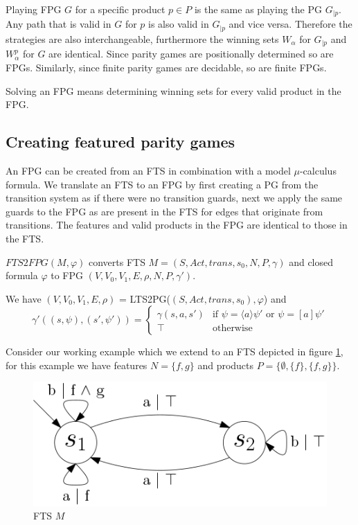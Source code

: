 Playing FPG $G$ for a specific product $p\in P$ is the same as playing the PG $G_{|p}$. Any path that is valid in $G$ for $p$ is also valid in $G_{|p}$ and vice versa. Therefore the strategies are also interchangeable, furthermore the winning sets $W_\alpha$ for $G_{|p}$ and $W_\alpha^p$ for $G$ are identical. Since parity games are positionally determined so are FPGs. Similarly, since finite parity games are decidable, so are finite FPGs.

Solving an FPG means determining winning sets for every valid product in the FPG.
\subsection{Creating featured parity games}
An FPG can be created from an FTS in combination with a model $\mu$-calculus formula. We translate an FTS to an FPG by first creating a PG from the transition system as if there were no transition guards, next we apply the same guards to the FPG as are present in the FTS for edges that originate from transitions. The features and valid products in the FPG are identical to those in the FTS.
\begin{definition}
	\label{def_FTS2FPG}
	$FTS2FPG(M, \varphi)$ converts FTS $M = (S, Act, trans, s_0, N, P, \gamma)$ and closed formula $\varphi$ to FPG $(V, V_0, V_1, E, \rho, N, P, \gamma')$.
	
	We have $(V, V_0, V_1, E, \rho)$ = LTS2PG($(S, Act, trans, s_0), \varphi$) and
	\[ \gamma'((s, \psi),(s', \psi')) = \begin{cases}
	\gamma(s,a,s') & \text{if }\psi = \langle a \rangle \psi'\text{ or }\psi = [a]\psi' \\
	\top & \text{otherwise}
	\end{cases}\]
\end{definition}
Consider our working example which we extend to an FTS depicted in figure \ref{fig:exverfts}, for this example we have features $N = \{f, g\}$ and products $P = \{\emptyset, \{f\},\{f,g\}\}$.
\begin{figure}[h]
	\centering
	\includegraphics[scale=0.3]{Examples/ExamleVerification/FTS}
	\caption[FTS $M$]{FTS $M$}
	\label{fig:exverfts}
\end{figure}
